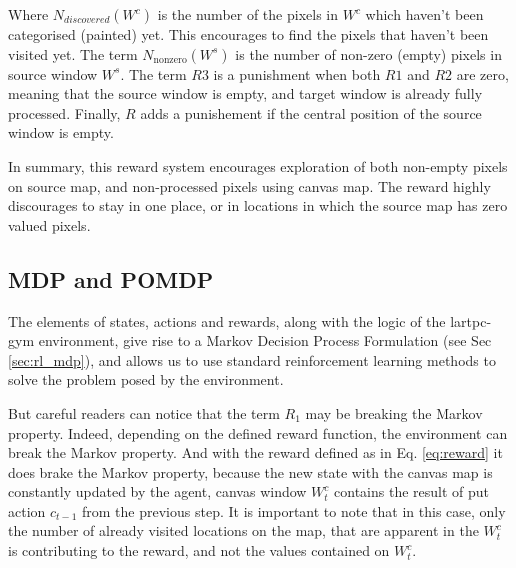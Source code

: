 Where \(N_{discovered}(W^{c})\) is the number of the pixels in $W^{c}$ which haven't been categorised (painted) yet.
This encourages to find the pixels that haven't been visited yet.
The term $N_{\mathrm{nonzero}}(W^{s})$ is the number of non-zero (empty) pixels in source window $W^s$.
The term $R3$ is a punishment when both $R1$ and $R2$ are zero, meaning that the source window is empty, and target window is already fully processed.
Finally, $R$ adds a punishement if the central position of the source window is empty.

In summary, this reward system encourages exploration of both non-empty pixels on source map, and non-processed pixels using canvas map.
The reward highly discourages to stay in one place, or in locations in which the source map has zero valued pixels.

\subsection{MDP and POMDP}

The elements of states, actions and rewards, along with the logic of the lartpc-gym environment, give rise to a Markov Decision Process Formulation (see Sec \ref{sec:rl_mdp}), and allows us to use standard reinforcement learning methods to solve the problem posed by the environment.

But careful readers can notice that the term $R_{1}$ may be breaking the Markov property.
Indeed, depending on the defined reward function, the environment can break the Markov property. 
And with the reward defined as in Eq. \ref{eq:reward} it does brake the Markov property, because the new state with the canvas map is constantly updated by the agent, canvas window $W^{c}_{t}$ contains the result of put action $c_{t-1}$ from the previous step. It is important to note that in this case, only the number of already visited locations on the map, that are apparent in the $W^{c}_{t}$ is contributing to the reward, and not the values contained on $W^{c}_{t}$.

